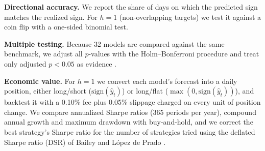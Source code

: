 \textbf{Directional accuracy.} We report the share of days on which the predicted sign matches the realized sign. For $h=1$ (non-overlapping targets) we test it against a coin flip with a one-sided binomial test.

\textbf{Multiple testing.} Because 32 models are compared against the same benchmark, we adjust all $p$-values with the Holm--Bonferroni procedure \cite{holm1979} and treat only adjusted $p<0.05$ as evidence \cite{harvey2016}.

\textbf{Economic value.} For $h=1$ we convert each model's forecast into a daily position, either long/short ($\mathrm{sign}(\hat y_t)$) or long/flat ($\max(0, \mathrm{sign}(\hat y_t))$), and backtest it with a 0.10\% fee plus 0.05\% slippage charged on every unit of position change. We compare annualized Sharpe ratios (365 periods per year), compound annual growth and maximum drawdown with buy-and-hold, and we correct the best strategy's Sharpe ratio for the number of strategies tried using the deflated Sharpe ratio (DSR) of Bailey and L\'opez de Prado \cite{bailey2014}.
